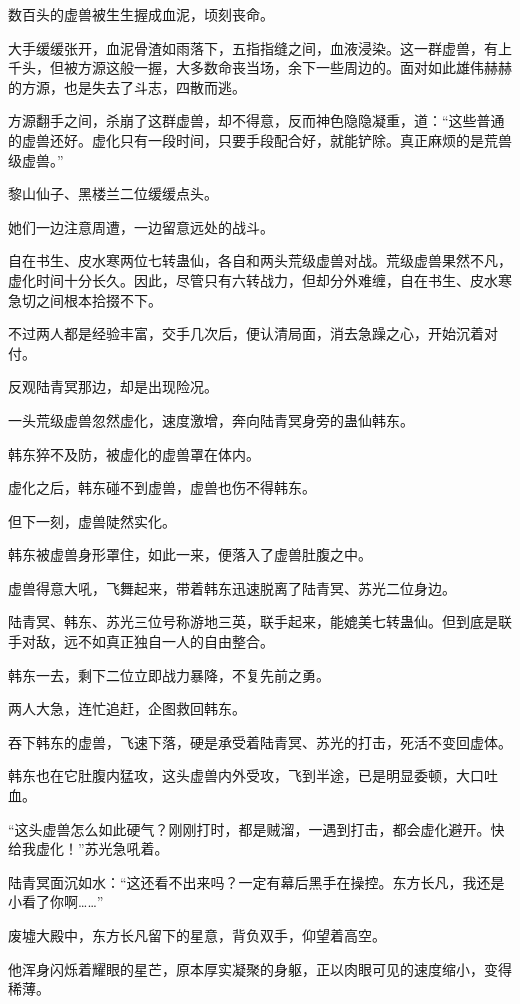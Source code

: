 \begin{this_body}
数百头的虚兽被生生握成血泥，顷刻丧命。

大手缓缓张开，血泥骨渣如雨落下，五指指缝之间，血液浸染。这一群虚兽，有上千头，但被方源这般一握，大多数命丧当场，余下一些周边的。面对如此雄伟赫赫的方源，也是失去了斗志，四散而逃。

方源翻手之间，杀崩了这群虚兽，却不得意，反而神色隐隐凝重，道：“这些普通的虚兽还好。虚化只有一段时间，只要手段配合好，就能铲除。真正麻烦的是荒兽级虚兽。”

黎山仙子、黑楼兰二位缓缓点头。

她们一边注意周遭，一边留意远处的战斗。

自在书生、皮水寒两位七转蛊仙，各自和两头荒级虚兽对战。荒级虚兽果然不凡，虚化时间十分长久。因此，尽管只有六转战力，但却分外难缠，自在书生、皮水寒急切之间根本拾掇不下。

不过两人都是经验丰富，交手几次后，便认清局面，消去急躁之心，开始沉着对付。

反观陆青冥那边，却是出现险况。

一头荒级虚兽忽然虚化，速度激增，奔向陆青冥身旁的蛊仙韩东。

韩东猝不及防，被虚化的虚兽罩在体内。

虚化之后，韩东碰不到虚兽，虚兽也伤不得韩东。

但下一刻，虚兽陡然实化。

韩东被虚兽身形罩住，如此一来，便落入了虚兽肚腹之中。

虚兽得意大吼，飞舞起来，带着韩东迅速脱离了陆青冥、苏光二位身边。

陆青冥、韩东、苏光三位号称游地三英，联手起来，能媲美七转蛊仙。但到底是联手对敌，远不如真正独自一人的自由整合。

韩东一去，剩下二位立即战力暴降，不复先前之勇。

两人大急，连忙追赶，企图救回韩东。

吞下韩东的虚兽，飞速下落，硬是承受着陆青冥、苏光的打击，死活不变回虚体。

韩东也在它肚腹内猛攻，这头虚兽内外受攻，飞到半途，已是明显委顿，大口吐血。

“这头虚兽怎么如此硬气？刚刚打时，都是贼溜，一遇到打击，都会虚化避开。快给我虚化！”苏光急吼着。

陆青冥面沉如水：“这还看不出来吗？一定有幕后黑手在操控。东方长凡，我还是小看了你啊……”

废墟大殿中，东方长凡留下的星意，背负双手，仰望着高空。

他浑身闪烁着耀眼的星芒，原本厚实凝聚的身躯，正以肉眼可见的速度缩小，变得稀薄。


\end{this_body}
